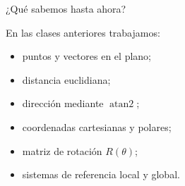 \documentclass[aspectratio=169]{beamer}
\begin{document}
\begin{frame}{¿Qué sabemos hasta ahora?}

    En las clases anteriores trabajamos:

    \begin{itemize}
        \item puntos y vectores en el plano;
        \item distancia euclidiana;
        \item dirección mediante $\operatorname{atan2}$;
        \item coordenadas cartesianas y polares;
        \item matriz de rotación $R(\theta)$;
        \item sistemas de referencia local y global.
    \end{itemize}

    \vspace{0.3cm}


\end{frame}
\end{document}
